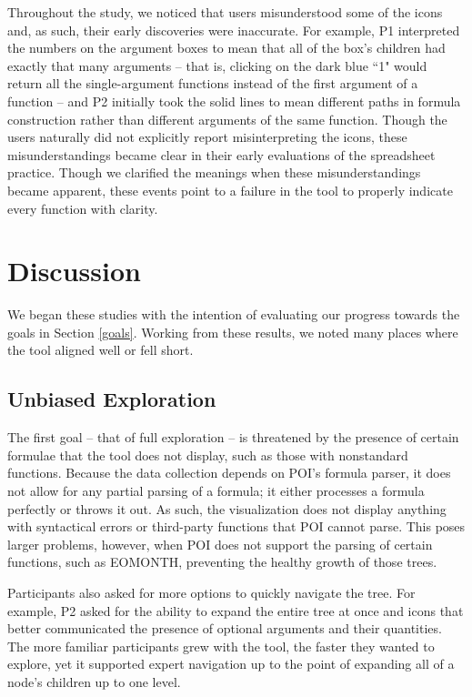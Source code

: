 \documentclass[conference]{IEEEtran}
\begin{document}
	Throughout the study, we noticed that users misunderstood some of the icons
	and, as such, their early discoveries were inaccurate. For example, P1
	interpreted the numbers on the argument boxes to mean that all of the box's
	children had exactly that many arguments -- that is, clicking on the dark blue
	``1" would return all the single-argument functions instead of the first
	argument of a function -- and P2 initially took the solid lines to mean
	different paths in formula construction rather than different arguments of the
	same function. Though the users naturally did not explicitly report
	misinterpreting the icons, these misunderstandings became clear in their early
	evaluations of the spreadsheet practice. Though we clarified the meanings when
	these misunderstandings became apparent, these events point to a failure in the
	tool to properly indicate every function with clarity.   \par
	
	
	\section{Discussion} We began these studies with the intention of evaluating
	our progress towards the goals in Section \ref{goals}. Working from these
	results, we noted many places where the tool aligned well or fell short.
	
	\subsection{Unbiased Exploration} The first goal -- that of full exploration --
	is threatened by the presence of certain formulae that the tool does not
	display, such as those with nonstandard functions. Because the data collection
	depends on POI's formula parser, it does not allow for any partial parsing of a
	formula; it either processes a formula perfectly or throws it out. As such, the
	visualization does not display anything with syntactical errors or third-party
	functions that POI cannot parse. This poses larger problems, however, when POI
	does not support the parsing of certain functions, such as EOMONTH, preventing
	the healthy growth of those trees. \par
	
	Participants also asked for more options to quickly navigate the tree. For
	example, P2 asked for the ability to expand the entire tree at once and icons
	that better communicated the presence of optional arguments and their
	quantities. The more familiar participants grew with the tool, the faster they
	wanted to explore, yet it supported expert navigation up to the point of
	expanding all of a node's children up to one level. \par
	
\end{document}

